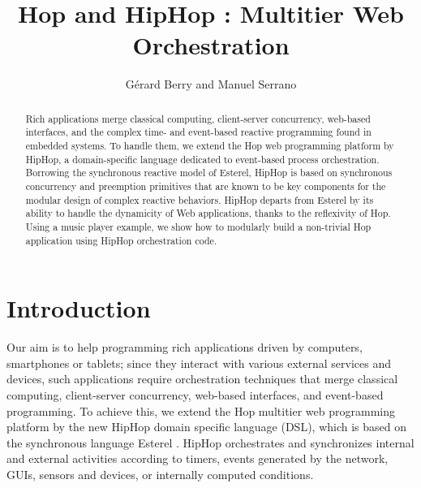 \documentclass{llncs}
\begin{document}
\title{Hop and HipHop : Multitier Web Orchestration}


\author{G{\'e}rard Berry and Manuel Serrano}


\maketitle

\begin{abstract}
Rich applications merge classical computing, client-server
concurrency, web-based interfaces, and the complex time- and
event-based reactive programming found in embedded systems. To handle
them, we extend the Hop web programming platform by HipHop, a
domain-specific language dedicated to event-based process
orchestration. Borrowing the synchronous reactive model of Esterel,
HipHop is based on synchronous concurrency and preemption primitives
that are known to be key components for the modular design of complex
reactive behaviors. HipHop departs from Esterel by its ability to
handle the dynamicity of Web applications, thanks to the reflexivity
of Hop.  Using a music player example, we show how to modularly build
a non-trivial Hop application using HipHop orchestration code.
\end{abstract}

\section{Introduction}
\label{Introduction}

Our aim is to help programming rich applications driven by computers,
smartphones or tablets; since they interact with various external
services and devices, such applications require orchestration
techniques that merge classical computing, client-server concurrency,
web-based interfaces, and event-based programming. To achieve this, we
extend the Hop multitier web programming platform \cite{sb:cacm12} by
the new HipHop domain specific language (DSL), which is based on the
synchronous language Esterel \cite{berry2000foundations}. HipHop
orchestrates and synchronizes internal and external activities
according to timers, events generated by the network, GUIs, sensors
and devices, or internally computed conditions.
\end{document}
